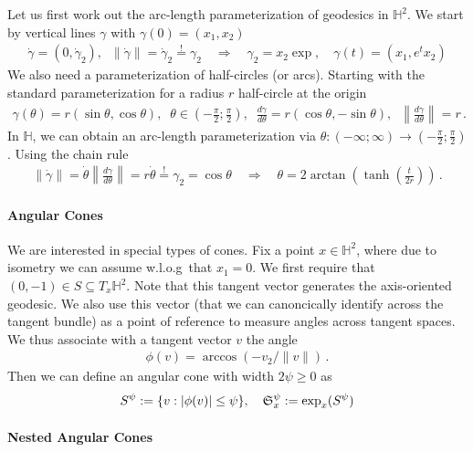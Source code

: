 \documentclass{article}
\begin{document}
Let us first  work out the arc-length parameterization of geodesics in $\mathbb H^2$. We start by vertical lines $\gamma$ with $\gamma(0) = (x_1,x_2)$
\begin{align}
\dot\gamma = (0, \dot \gamma_2), \;\;
\| \dot \gamma\| = \dot \gamma_2  \stackrel != \gamma_2
\quad \Longrightarrow \quad \gamma_2 = x_2 \exp, \quad 
\gamma(t)  = (x_1, e^t x_2)
\end{align}
\noindent We also need a parameterization of half-circles (or arcs). Starting with the standard parameterization for a radius $r$ half-circle at the origin 
\begin{align}
\gamma(\theta) = r (\sin \theta, \cos \theta),\;\; \theta \in (-\tfrac \pi 2 ; \tfrac \pi 2), \;\;
\frac{d\gamma}{d\theta} = r(\cos\theta, -\sin\theta),
\;\; \left\|\frac{d\gamma}{d\theta} \right\| = r\,.
\end{align}
In $\mathbb H$, we can obtain an arc-length parameterization via $\theta: (-\infty;\infty) \to (-\tfrac \pi2; \tfrac \pi 2) $. Using the chain rule
\begin{align}
\left\| \dot \gamma \right\|  =  \dot\theta \left\|  \frac{d\gamma}{d \theta}\right\| 
= r  \dot\theta  \stackrel != \gamma_2 = \cos\theta
\quad \Longrightarrow  \quad 
\theta = 2 \arctan \left(\tanh\left(  \frac t{2r} \right) \right) \,.
\end{align}

\paragraph*{Angular Cones} 

We are interested in special types of cones. Fix a point $x \in \mathbb H^2$, where due to isometry we can assume w.l.o.g~that $x_1=0$.  We first require that $(0,-1) \in S \subseteq T_x\mathbb H^2$. Note that this tangent vector generates the axis-oriented geodesic.  We also use this vector (that we can canoncically identify across the tangent bundle) as a point of reference to measure angles across tangent spaces. We thus associate with a tangent vector $v$ the angle
\begin{align}
\phi(v) = \arccos(-v_2/\|v\|) \,.
\end{align}
Then we can define an angular cone with width $2\psi \ge 0$ as 
\begin{align}
S^\psi := \{ v: |\phi(v)| \le \psi \}, \quad \frak S^\psi_x := \exp_x(S^\psi)
\end{align}

\paragraph*{Nested Angular Cones} 
\end{document}
